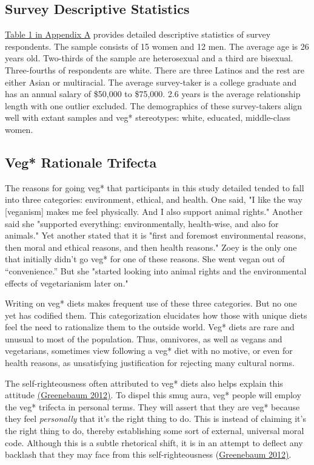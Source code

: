 \documentclass[twoside]{report}
\begin{document}
\begin{multicols}{2}
\subsection{Survey Descriptive Statistics}

\hyperlink{appendix-a}{Table 1 in Appendix A} provides detailed descriptive statistics of survey respondents. The sample consists of 15 women and 12 men. The average age is 26 years old. Two-thirds of the sample are heterosexual and a third are bisexual. Three-fourths of respondents are white. There are three
Latinos and the rest are either Asian or multiracial. The average
survey-taker is a college graduate and has an annual salary of \$50,000
to \$75,000. 2.6 years is the average relationship length with
one outlier excluded. The demographics of these survey-takers align
well with extant samples and veg* stereotypes: white, educated,
middle-class women.

\subsection{Veg* Rationale Trifecta}

The reasons for going veg* that participants in this study detailed tended to fall into three categories: environment, ethical, and health. One said, "I like the way {[}veganism{]} makes me feel physically. And I also support animal rights." Another said she "supported everything: environmentally, health-wise, and also for animals." Yet another stated that it is "first and foremost environmental reasons, then moral and ethical reasons, and then health reasons." Zoey is the only one that initially didn't go veg* for one of
these reasons. She went vegan out of ``convenience.'' But she "started
looking into animal rights and the environmental effects of vegetarianism later on."

Writing on veg* diets makes frequent use of these three categories. But
no one yet has codified them. This categorization elucidates how those with unique diets feel the need to rationalize them to the outside world. Veg*
diets are rare and unusual to most of the population. Thus, omnivores, as well as vegans and vegetarians, sometimes view following a veg* diet with no motive, or even for health reasons, as unsatisfying justification for rejecting many cultural norms.

The self-righteousness often attributed to veg* diets also helps explain
this attitude \hyperlink{greenebaum}{(Greenebaum 2012)}. To dispel this smug aura, veg* people will employ the veg* trifecta in personal terms. They will assert that they are veg* because they feel \emph{personally} that it's the right thing to do. This is instead of claiming it's the right thing to do, thereby
establishing some sort of external, universal moral code. Although this
is a subtle rhetorical shift, it is in an attempt to deflect any
backlash that they may face from this self-righteousness (\hyperlink{greenebaum}{Greenebaum 2012)}.


\end{multicols}
\end{document}
